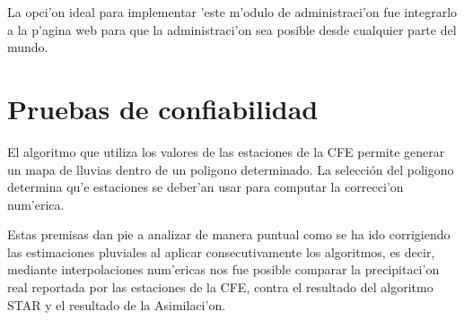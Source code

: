 La opci'on ideal para implementar 'este m'odulo de administraci'on fue integrarlo a la p'agina web
para que la administraci'on sea posible desde cualquier parte del mundo.


\section{Pruebas de confiabilidad}
El algoritmo que utiliza los valores de las estaciones de la CFE permite generar un mapa de lluvias dentro de un poligono
determinado. La selección del poligono determina qu'e estaciones se deber'an usar para computar la correcci'on num'erica.

Estas premisas dan pie a analizar de manera puntual como se ha ido corrigiendo las estimaciones pluviales al aplicar
consecutivamente los algoritmos, es decir, mediante interpolaciones num'ericas nos fue posible comparar la precipitaci'on
real reportada por las estaciones de la CFE, contra el resultado del algoritmo STAR y el resultado de la Asimilaci'on.

